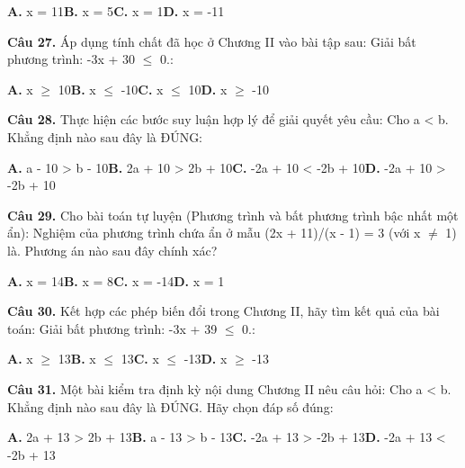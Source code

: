 \documentclass[11pt,a4paper]{article}
\begin{document}
\hspace*{1.5em}\textbf{A.} x = 11\quad\quad \textbf{B.} x = 5\quad\quad \textbf{C.} x = 1\quad\quad \textbf{D.} x = -11\par\vspace{2pt}
\textbf{\color{primary} Câu 27.} Áp dụng tính chất đã học ở Chương II vào bài tập sau: Giải bất phương trình: -3x + 30 $\le$ 0.:\par
\hspace*{1.5em}\textbf{A.} x $\ge$ 10\quad\quad \textbf{B.} x $\le$ -10\quad\quad \textbf{C.} x $\le$ 10\quad\quad \textbf{D.} x $\ge$ -10\par\vspace{2pt}
\textbf{\color{primary} Câu 28.} Thực hiện các bước suy luận hợp lý để giải quyết yêu cầu: Cho a < b. Khẳng định nào sau đây là ĐÚNG:\par
\hspace*{1.5em}\textbf{A.} a - 10 > b - 10\quad\quad \textbf{B.} 2a + 10 > 2b + 10\quad\quad \textbf{C.} -2a + 10 < -2b + 10\quad\quad \textbf{D.} -2a + 10 > -2b + 10\par\vspace{2pt}
\textbf{\color{primary} Câu 29.} Cho bài toán tự luyện (Phương trình và bất phương trình bậc nhất một ẩn): Nghiệm của phương trình chứa ẩn ở mẫu (2x + 11)/(x - 1) = 3 (với x $\ne$ 1) là. Phương án nào sau đây chính xác?\par
\hspace*{1.5em}\textbf{A.} x = 14\quad\quad \textbf{B.} x = 8\quad\quad \textbf{C.} x = -14\quad\quad \textbf{D.} x = 1\par\vspace{2pt}
\textbf{\color{primary} Câu 30.} Kết hợp các phép biến đổi trong Chương II, hãy tìm kết quả của bài toán: Giải bất phương trình: -3x + 39 $\le$ 0.:\par
\hspace*{1.5em}\textbf{A.} x $\ge$ 13\quad\quad \textbf{B.} x $\le$ 13\quad\quad \textbf{C.} x $\le$ -13\quad\quad \textbf{D.} x $\ge$ -13\par\vspace{2pt}
\textbf{\color{primary} Câu 31.} Một bài kiểm tra định kỳ nội dung Chương II nêu câu hỏi: Cho a < b. Khẳng định nào sau đây là ĐÚNG. Hãy chọn đáp số đúng:\par
\hspace*{1.5em}\textbf{A.} 2a + 13 > 2b + 13\quad\quad \textbf{B.} a - 13 > b - 13\quad\quad \textbf{C.} -2a + 13 > -2b + 13\quad\quad \textbf{D.} -2a + 13 < -2b + 13\par\vspace{2pt}
\end{document}
